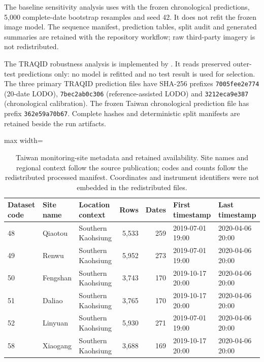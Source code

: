 \documentclass[review,12pt,authoryear]{elsarticle}
\begin{document}
The baseline sensitivity analysis uses
with the frozen chronological predictions, 5,000 complete-date bootstrap
resamples and seed 42. It does not refit the frozen image model. The sequence
manifest, prediction tables, split audit and generated summaries are retained
with the repository workflow; raw third-party imagery is not redistributed.

The TRAQID robustness analysis is implemented by
. It reads
preserved outer-test predictions only: no model is refitted and no test result
is used for selection. The three primary TRAQID prediction files have SHA-256
prefixes \texttt{7005fee2e774} (20-date LODO), \texttt{7bec2ab0c306}
(reference-assisted LODO) and \texttt{3212eca9e387} (chronological
calibration). The frozen Taiwan chronological prediction file has prefix
\texttt{362e59a70b67}. Complete hashes and deterministic split manifests are
retained beside the run artifacts.

\begin{table}[H]
\centering
\caption{Taiwan monitoring-site metadata and retained availability. Site names
and regional context follow the source publication; codes and counts follow the
redistributed processed manifest. Coordinates and instrument identifiers were
not embedded in the redistributed files.}
\label{tab:taiwan-availability}
\begin{adjustbox}{max width=\textwidth}
\begin{tabular}{lllrrll}
\toprule
Dataset code & Site name & Location context & Rows & Dates & First timestamp & Last timestamp \\
\midrule
48 & Qiaotou & Southern Kaohsiung & 5,533 & 259 & 2019-07-01 19:00 & 2020-04-06 20:00 \\
49 & Renwu & Southern Kaohsiung & 5,952 & 273 & 2019-07-01 19:00 & 2020-04-06 20:00 \\
50 & Fengshan & Southern Kaohsiung & 3,743 & 170 & 2019-10-17 20:00 & 2020-04-06 20:00 \\
51 & Daliao & Southern Kaohsiung & 3,765 & 170 & 2019-10-17 20:00 & 2020-04-06 20:00 \\
52 & Linyuan & Southern Kaohsiung & 5,930 & 271 & 2019-07-01 19:00 & 2020-04-06 20:00 \\
58 & Xiaogang & Southern Kaohsiung & 3,688 & 169 & 2019-10-17 20:00 & 2020-04-06 20:00 \\
\bottomrule
\end{tabular}
\end{adjustbox}
\end{table}
\end{document}
